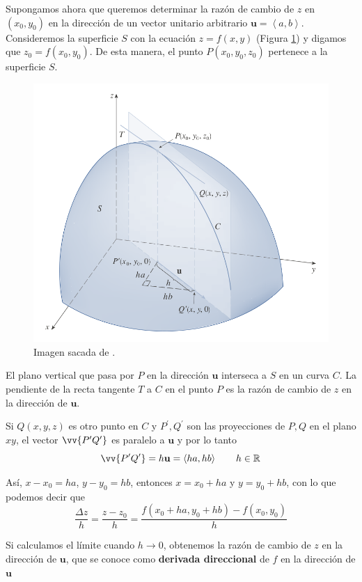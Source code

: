 \documentclass[12pt]{article}
\begin{document}
Supongamos ahora que queremos determinar la razón de cambio de $ z $ en $ (x_{0},y_{0}) $ en la dirección de un vector unitario arbitrario $ \mathbf{u}=\left\langle a,b \right\rangle $. Consideremos la superficie $ S $ con la ecuación $ z=f(x,y) $ (Figura \ref{fig:dv-direccional}) y digamos que $ z_{0}=f(x_{0},y_{0}) $. De esta manera, el punto $ P(x_{0},y_{0},z_{0}) $ pertenece a la superficie $ S $.

\begin{figure}[H]
  \centering
  \includegraphics[width=0.6\linewidth]{imagenes/dv-direccional.png}
  \caption{Imagen sacada de \parencite{stewart2}.}
  \label{fig:dv-direccional}
\end{figure}

El plano vertical que pasa por $ P $ en la dirección $ \mathbf{u} $ interseca a $ S $ en un curva $ C $. La pendiente de la recta tangente $ T $ a $ C $ en el punto $ P $ es la razón de cambio de $ z $ en la dirección de $ \mathbf{u} $.

Si $ Q(x,y,z) $ es otro punto en $ C $ y $ P^{\prime}, Q^{\prime} $ son las proyecciones de $ P, Q $ en el plano $ xy $, el vector $ \vv{P^{\prime}Q^{\prime}} $ es paralelo a $ \mathbf{u} $ y por lo tanto
\[
\vv{P^{\prime}Q^{\prime}}=h\mathbf{u}=\left\langle ha,hb \right\rangle \qquad h \in \mathbb{R}^{}
\]

Así, $ x-x_{0}=ha $, $ y-y_{0}=hb $, entonces $ x=x_{0}+ha $ y $ y=y_{0}+hb $, con lo que podemos decir que
\[
	\frac{\Delta z}{h} = \frac{z-z_{0}}{h} = \frac{f(x_{0}+ha,y_{0}+hb)-f(x_{0},y_{0})}{h}
\]

Si calculamos el límite cuando $ h \to 0 $, obtenemos la razón de cambio de $ z $ en la dirección de $ \mathbf{u} $, que se conoce como \textbf{derivada direccional} de $ f $ en la dirección de $ \mathbf{u} $

\vspace{0.2cm}
\vspace{0.2cm}
\end{document}

